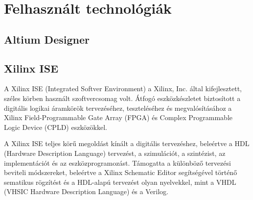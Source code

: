 \chapter{Felhasznált technológiák}

\section{Altium Designer}

\section{Xilinx ISE}

A Xilinx ISE (Integrated Softver Environment) a Xilinx, Inc. által kifejlesztett, széles körben használt szoftvercsomag volt. Átfogó eszközkészletet biztosított a digitális logikai áramkörök tervezéséhez, teszteléséhez és megvalósításához a Xilinx Field-Programmable Gate Array (FPGA) és Complex Programmable Logic Device (CPLD) eszközökkel.

A Xilinx ISE teljes körű megoldást kínált a digitális tervezéshez, beleértve a HDL (Hardware Description Language) tervezést, a szimulációt, a szintézist, az implementációt és az eszközprogramozást. Támogatta a különböző tervezési beviteli módszereket, beleértve a Xilinx Schematic Editor segítségével történő sematikus rögzítést és a HDL-alapú tervezést olyan nyelvekkel, mint a VHDL (VHSIC Hardware Description Language) és a Verilog.